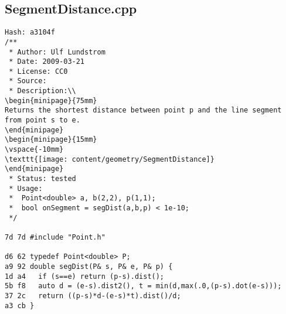 \documentclass[11pt, a4paper, twoside]{article}
\begin{document}
\subsection{SegmentDistance.cpp}
\begin{lstlisting}
Hash: a3104f
/**
 * Author: Ulf Lundstrom
 * Date: 2009-03-21
 * License: CC0
 * Source:
 * Description:\\
\begin{minipage}{75mm}
Returns the shortest distance between point p and the line segment from point s to e.
\end{minipage}
\begin{minipage}{15mm}
\vspace{-10mm}
\texttt{[image: content/geometry/SegmentDistance]}
\end{minipage}
 * Status: tested
 * Usage: 
 * 	Point<double> a, b(2,2), p(1,1);
 * 	bool onSegment = segDist(a,b,p) < 1e-10;
 */

7d 7d #include "Point.h"

d6 62 typedef Point<double> P;
a9 92 double segDist(P& s, P& e, P& p) {
1d a4 	if (s==e) return (p-s).dist();
5b f8 	auto d = (e-s).dist2(), t = min(d,max(.0,(p-s).dot(e-s)));
37 2c 	return ((p-s)*d-(e-s)*t).dist()/d;
a3 cb }
\end{lstlisting}
\end{document}
